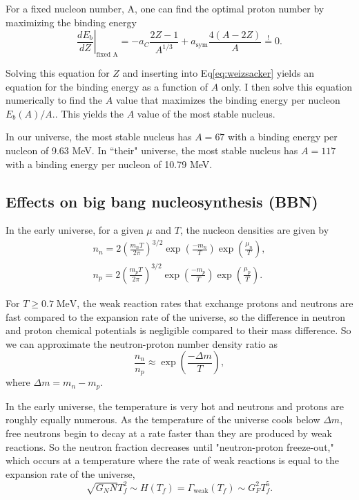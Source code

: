 \documentclass[%
 reprint,
 amsmath,amssymb,
 aps,
]{revtex4-1}
\begin{document}
For a fixed nucleon number, A, one can find the optimal proton number by maximizing the binding energy
\begin{equation}
    \left. \frac{d E_b}{d Z}\right|_{\text{fixed A}} =
    - a_C \frac{2Z - 1}{A^{1/3}}
    + a_{\text{sym}} \frac{4 (A - 2Z)}{A}
    \overset{!}{=} 0.
\end{equation}

Solving this equation for $Z$ and inserting into Eq\eqref{eq:weizsacker} yields an equation for the binding energy as a function of $A$ only. I then solve this equation numerically to find the $A$ value that maximizes the binding energy per nucleon $E_b(A) / A$.\cite{jupyter_notebook}. This yields the $A$ value of the most stable nucleus.

In our universe, the most stable nucleus has $A = 67$ with a binding energy per nucleon of 9.63 MeV. In ``their" universe, the most stable nucleus has $A = 117$ with a binding energy per nucleon of 10.79 MeV.

\subsection{\label{sec:bbn}Effects on big bang nucleosynthesis (BBN)}

In the early universe, for a given $\mu$ and $T$, the nucleon densities are given by\cite{ReddyLectureNotes}
\begin{align}
    n_n = 2 \left( \frac{m_n T}{2 \pi} \right)^{3/2}
    \exp\left( \frac{-m_n}{T} \right) \exp\left( \frac{\mu_n}{T} \right), \\
    n_p = 2 \left( \frac{m_p T}{2 \pi} \right)^{3/2}
    \exp\left( \frac{-m_p}{T} \right) \exp\left( \frac{\mu_p}{T} \right).
\end{align}

For $T \ge 0.7 \; \text{MeV}$, the weak reaction rates that exchange protons and neutrons are fast compared to the expansion rate of the universe, so the difference in neutron and proton chemical potentials is negligible compared to their mass difference. So we can approximate the neutron-proton number density ratio as
\begin{equation}
    \frac{n_n}{n_p} \approx \exp \left( \frac{- \Delta m}{T} \right),
\end{equation}
where $\Delta m = m_n - m_p$.\cite{ReddyLectureNotes}

In the early universe, the temperature is very hot and neutrons and protons are roughly equally numerous. As the temperature of the universe cools below $\Delta m$, free neutrons begin to decay at a rate faster than they are produced by weak reactions. So the neutron fraction decreases until "neutron-proton freeze-out," which occurs at a temperature where the rate of weak reactions is equal to the expansion rate of the universe,\cite{CAMPBELL1995429}
\begin{equation}
    \sqrt{G_N N} T_f^2 \sim H(T_f) = \Gamma_\text{weak} (T_f) \sim G_F^2 T_f^5.
\end{equation}
\end{document}
